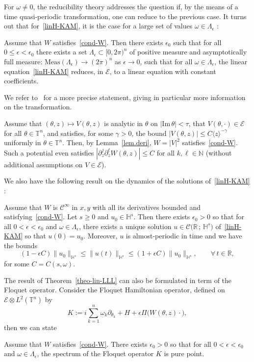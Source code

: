 \documentclass[AHL,Unicode,published]{cedram}
\newcommand{\R}{\mathbb{R}}
\newcommand{\T}{\mathbb{T}}
\newcommand{\HH}{\mathbb{H}}
\newcommand{\N}{\mathbb{N}}
\newcommand{\E}{\mathcal{E}}
\newcommand{\clC}{\mathcal{C}}
\newcommand*\eps{\epsilon}
\newcommand{\om}{\omega}
\newcommand{\ov}{\overline}
\newcommand{\<}{\langle}
\renewcommand{\>}{\rangle}
\let\oldforall\forall
\renewcommand*{\forall}{\mathrel{\oldforall}}
\newcommand{\R}{\mathbb{R}}
\begin{document}
For $\om \neq 0$, the reducibility theory addresses the question if, by the means of a time quasi-periodic transformation, one can reduce to the previous case. It turns out that for~\eqref{linH-KAM}, it is the case for a large set of values $\om \in \Lambda_{\eps} $ :

\begin{theo}\label{theo-lin-LLL}
Assume that $W$ satisfies~\eqref{cond-W}. Then there exists $\epsilon_0$ such that for all $0\leq\epsilon<\epsilon_0$ there exists a set $\Lambda_{\eps} \subset [0,2\pi)^n$ of positive measure and asymptotically full measure: $\mbox{Meas}(\Lambda_{\eps}) \to (2\pi)^n$ as $\epsilon \to 0$, such that for all
$\omega\in \Lambda_{\eps} $, the linear equation~\eqref{linH-KAM} reduces, in $\E$, to a linear equation with constant coefficients.
\end{theo}

We refer to~\cite[Theorem~7.1]{Grebert-Thomann} for a more precise statement, giving in particular more information on the transformation.

Assume that $(\theta, z) \mapsto V(\theta,z)$ is analytic in $\theta$ on $|\text{Im}\,\theta|<\tau$, that $V(\theta, \cdot) \in \E$ for all $\theta \in \T^n$, and satisfies, for some $\gamma>0$, the bound $|V(\theta,z)|\leq C\<z\>^{-\gamma}$ uniformly in $\theta \in \T^n$. Then, by Lemma~\ref{lem.deri}, $W=|V|^2$ satisfies~\eqref{cond-W}. Such a potential even satisfies $|\partial^j_{z}\partial^{\ell}_{\ov z}W(\theta,z)|\leq C$ for all $k, \ell \in \N$ (without additional assumptions on $V \in \E$).

We also have the following result on the dynamics of the solutions of~\eqref{linH-KAM} :
\begin{coro}
Assume that $W$ is $\clC^{\infty}$ in $x,y$ with all its derivatives bounded and satisfying~\eqref{cond-W}. Let $s\geq 0$ and $u_{0}\in \HH^{s}$. Then there exists $\eps_{0}>0$ so that for all $0<\eps<\eps_{0}$ and $\om \in \Lambda_{\eps}$, there exists a unique solution $u \in \clC\big(\R\,;\,\HH^{s}\big)$ of~\eqref{linH-KAM} so that $u(0)=u_{0}$. Moreover, $u$ is almost-periodic in time and we have the bounds
\[
(1-\eps C)\|u_{0}\|_{\HH^{s}}\leq \|u(t)\|_{\HH^{s}}\leq (1+\eps C)\|u_{0}\|_{\HH^{s}}, \qquad \forall \,t\in \R,
\]
for some $C=C(s,\om)$.
\end{coro}


The result of Theorem~\ref{theo-lin-LLL} can also be formulated in term of the Floquet operator. Consider the Floquet Hamiltonian operator, defined on $\E\otimes L^2(\T^n)$ by
\[
K:=i\sum_{k=1}^n\omega_k \partial_{ \theta_k} +H +\epsilon \Pi \big(W(\theta,z) \cdot \big),
\]
then we can state
\begin{coro}
Assume that $W$ satisfies~\eqref{cond-W}. There exists $\eps_{0}>0$ so that for all $0<\eps<\eps_{0}$ and $\om \in \Lambda_{\eps}$, the spectrum of the Floquet operator $K$ is pure point.
\end{coro}
\end{document}
